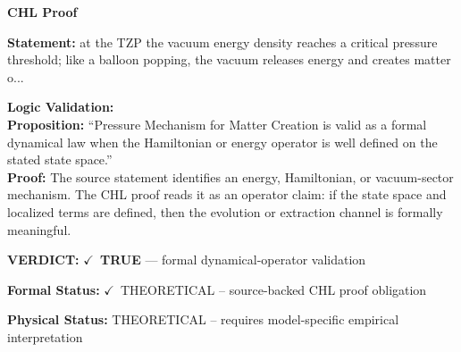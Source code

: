 \vspace{0.45em}
\noindent\textbf{CHL Proof}\par
\textbf{Statement:} at the TZP the vacuum energy density reaches a critical pressure threshold; like a
balloon popping, the vacuum releases energy and creates matter o...

\textbf{Logic Validation:}\\
\textbf{Proposition:} ``Pressure Mechanism for Matter Creation is valid as a formal dynamical law when the
Hamiltonian or energy operator is well defined on the stated state space.''\\
\textbf{Proof:} The source statement identifies an energy, Hamiltonian, or vacuum-sector mechanism. The
CHL proof reads it as an operator claim: if the state space and localized terms are
defined, then the evolution or extraction channel is formally meaningful.

\textbf{VERDICT:} \ensuremath{\checkmark}\ \textbf{TRUE} --- formal dynamical-operator validation

\textbf{Formal Status:} \ensuremath{\checkmark}\ THEORETICAL -- source-backed CHL proof obligation

\textbf{Physical Status:} THEORETICAL -- requires model-specific empirical interpretation
\par\vspace{0.45em}
\par
\ifTZPDarkEdition
{}
\fi
\endgroup
\endgroup
